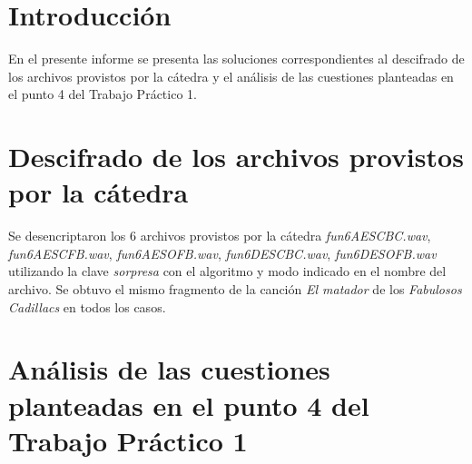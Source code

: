 \documentclass[a4paper,10pt]{article}
\author
{
	Pablo Giorgi,
	Santiago Perez De Rosso,
	Luciano Zemin
}
\date{Abril 2011}
\title{\articleTitle}
\begin{document}

\maketitle

\tableofcontents

\section{Introducción}

En el presente informe se presenta las soluciones correspondientes al descifrado
de los archivos provistos por la c\'atedra y el an\'alisis de las cuestiones
planteadas en el punto 4 del Trabajo Pr\'actico 1.

\section{Descifrado de los archivos provistos por la c\'atedra}

Se desencriptaron los 6 archivos provistos por la c\'atedra
\emph{fun6AESCBC.wav}, \emph{fun6AESCFB.wav}, \emph{fun6AESOFB.wav},
\emph{fun6DESCBC.wav}, \emph{fun6DESOFB.wav} utilizando la clave \emph{sorpresa}
con el algoritmo y modo indicado en el nombre del archivo. Se obtuvo
el mismo fragmento de la canción \emph{El matador} de los \emph{Fabulosos Cadillacs}
en todos los casos.

\section{An\'alisis de las cuestiones planteadas en el punto 4 del Trabajo Pr\'actico 1}
\end{document}
